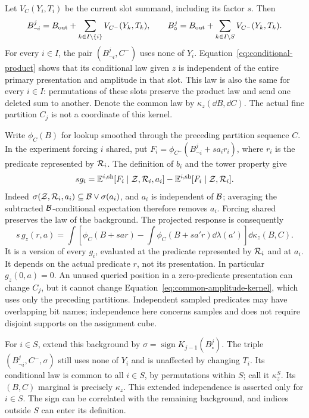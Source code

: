 Let $V_C(Y_i,T_i)$ be the current slot summand, including its factor $s$.
Then
\[
 B^j_{\neg i}=B_{\rm out}+\sum_{k\in I\setminus\{i\}}V_{C^-}(Y_k,T_k),
 \qquad
 B_\circ^j=B_{\rm out}+\sum_{k\in I\setminus S}V_{C^-}(Y_k,T_k).
\]
For every $i\in I$, the pair $(B^j_{\neg i},C^-)$ uses none of $Y_i$.
Equation~\ref{eq:conditional-product} shows that its conditional law
given $z$ is independent of the entire primary presentation and amplitude
in that slot. This law is also the same for every $i\in I$: permutations
of these slots preserve the product law and send one deleted sum to
another. Denote the common law by $\kappa_z(\dd B,\dd C)$.
The actual fine partition $C_j$ is not a coordinate of this kernel.

Write $\phi_C(B)$ for lookup smoothed through the preceding partition
sequence $C$. In the experiment forcing $i$ shared, put
$F_i=\phi_{C^-}(B^j_{\neg i}+sa_ir_i)$, where $r_i$ is the predicate
represented by $\mathcal R_i$. The definition of $b_i$ and the tower property give
\[
 s g_i=\mathbb E^{i,\mathrm{sh}}[F_i\mid\mathcal Z,\mathcal R_i,a_i]
              -\mathbb E^{i,\mathrm{sh}}[F_i\mid\mathcal Z,\mathcal R_i].
\]
Indeed $\sigma(\mathcal Z,\mathcal R_i,a_i)\subseteq\mathcal B\vee\sigma(a_i)$, and
$a_i$ is independent of $\mathcal B$; averaging the subtracted
$\mathcal B$-conditional expectation therefore removes $a_i$. Forcing shared
preserves the law of the background. The projected response is consequently
\begin{equation}\label{eq:common-amplitude-kernel}
 s\,g_z(r,a)=\int\left[
       \phi_C(B+sar)-\int\phi_C(B+sa'r)\dd\lambda(a')
                      \right]\dd\kappa_z(B,C).
\end{equation}
It is a version of every $g_i$, evaluated at the predicate represented
by $\mathcal R_i$ and at $a_i$. It depends on the actual predicate $r$, not
its presentation. In particular $g_z(0,a)=0$. An unused queried position
in a zero-predicate presentation can change $C_j$, but it cannot change
Equation~\ref{eq:common-amplitude-kernel}, which uses only the preceding
partitions. Independent sampled predicates may have overlapping bit
names; independence here concerns samples and does not require disjoint
supports on the assignment cube.

For $i\in S$, extend this background by
$\sigma=\operatorname{sign}K_{j-1}(B_\circ^j)$.
The triple $(B^j_{\neg i},C^-,\sigma)$ still uses none of $Y_i$ and is
unaffected by changing $T_i$. Its conditional law is common to all
$i\in S$, by permutations within $S$; call it $\kappa_z^S$.
Its $(B,C)$ marginal is precisely $\kappa_z$.
This extended independence is asserted only for $i\in S$.
The sign can be correlated with the remaining background, and indices
outside $S$ can enter its definition.

